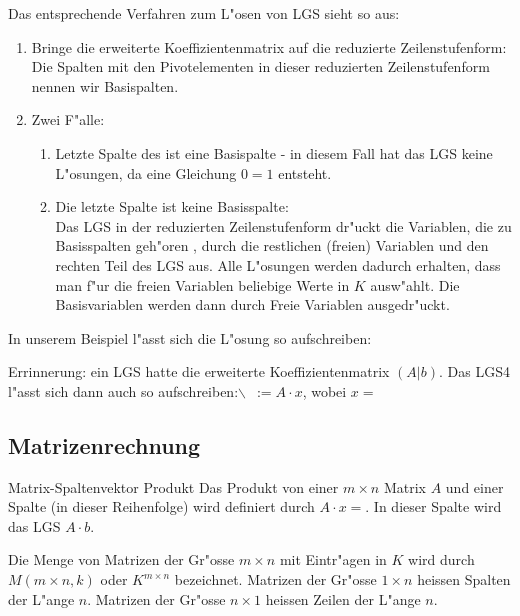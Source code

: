 \documentclass[11pt]{article}
\begin{document}
Das entsprechende Verfahren zum L"osen von LGS sieht so aus:
\begin{relation}
\begin{enumerate}
\item Bringe die erweiterte Koeffizientenmatrix auf die reduzierte
Zeilenstufenform: \\
Die Spalten mit den Pivotelementen in dieser reduzierten Zeilenstufenform
nennen wir Basispalten.
\item Zwei F"alle:
\begin{enumerate}
\item Letzte Spalte des ist eine Basispalte - in diesem Fall hat das LGS keine
L"osungen, da eine Gleichung \(0=1\) entsteht.
\item Die letzte Spalte ist keine Basisspalte: \\
Das LGS in der reduzierten Zeilenstufenform dr"uckt die Variablen, die zu
Basisspalten geh"oren , durch die restlichen (freien) Variablen und den
rechten Teil des LGS aus. Alle L"osungen werden dadurch erhalten, dass
man f"ur die freien Variablen beliebige Werte in \(K\) ausw"ahlt. Die
Basisvariablen werden dann durch Freie Variablen ausgedr"uckt.
\end{enumerate}
\end{enumerate}
\end{relation}

In unserem Beispiel l"asst sich die L"osung so aufschreiben: 


Errinnerung: ein LGS hatte die erweiterte Koeffizientenmatrix \((A|b)\). Das LGS4
l"asst sich dann auch so aufschreiben:$\backslash$\ \(:=A\cdot x\), wobei \(x=\)


\subsection{Matrizenrechnung}
\label{sec:org0f3e63e}
\begin{definition}{Matrix-Spaltenvektor Produkt}{}
Das Produkt von einer \(m\times n\) Matrix \(A\) und einer Spalte (in dieser
Reihenfolge) wird definiert durch \(A\cdot x =\). In dieser Spalte wird das LGS
\(A\cdot b\).
\end{definition}

Die Menge von Matrizen der Gr"osse \(m\times n\) mit Eintr"agen in \(K\) wird durch
\(M(m\times n, k)\) oder \(K^{m\times n}\) bezeichnet. Matrizen der Gr"osse \(1\times
n\) heissen Spalten der L"ange \(n\). Matrizen der Gr"osse \(n\times 1\) heissen
Zeilen der L"ange \(n\).
\end{document}
